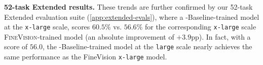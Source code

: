 \textbf{52-task Extended results.} These trends are further confirmed by our 52-task Extended evaluation suite (\cref{app:extended-evals}), where a \dcvlm-Baseline-trained model at the \texttt{x-large} scale, scores $60.5\%$ vs. $56.6\%$ for the corresponding \texttt{x-large} scale \textsc{FineVision}-trained model (an absolute improvement of $+3.9$pp). 
In fact, with a score of $56.0$, the \dcvlm-Baseline-trained model at the \texttt{large} scale nearly achieves the same performance as the FineVision \texttt{x-large} model.   






















